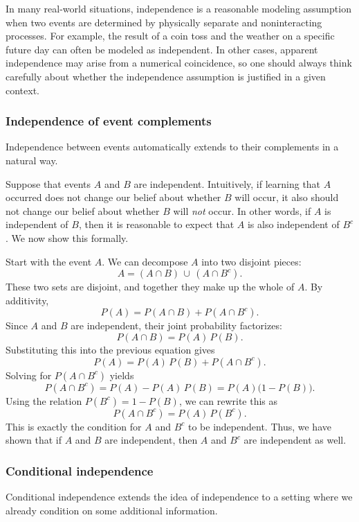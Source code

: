 In many real-world situations, independence is a reasonable modeling assumption when two events are determined by physically separate and noninteracting processes. For example, the result of a coin toss and the weather on a specific future day can often be modeled as independent. In other cases, apparent independence may arise from a numerical coincidence, so one should always think carefully about whether the independence assumption is justified in a given context.


\newpage
\subsubsection{ Independence of event complements}

Independence between events automatically extends to their complements in a natural way.

Suppose that events \(A\) and \(B\) are independent. Intuitively, if learning that \(A\) occurred does not change our belief about whether \(B\) will occur, it also should not change our belief about whether \(B\) will \textit{not} occur. In other words, if \(A\) is independent of \(B\), then it is reasonable to expect that \(A\) is also independent of \(B^c\). We now show this formally.

Start with the event \(A\). We can decompose \(A\) into two disjoint pieces:
\[
A = (A \cap B) \,\cup\, (A \cap B^c).
\]
These two sets are disjoint, and together they make up the whole of \(A\). By additivity,
\[
P(A) = P(A \cap B) + P(A \cap B^c).
\]
Since \(A\) and \(B\) are independent, their joint probability factorizes:
\[
P(A \cap B) = P(A)\,P(B).
\]
Substituting this into the previous equation gives
\[
P(A) = P(A)\,P(B) + P(A \cap B^c).
\]
Solving for \(P(A \cap B^c)\) yields
\[
P(A \cap B^c) = P(A) - P(A)\,P(B)
= P(A)\bigl(1 - P(B)\bigr).
\]
Using the relation \(P(B^c) = 1 - P(B)\), we can rewrite this as
\[
P(A \cap B^c) = P(A)\,P(B^c).
\]
This is exactly the condition for \(A\) and \(B^c\) to be independent. Thus, we have shown that if \(A\) and \(B\) are independent, then \(A\) and \(B^c\) are independent as well.


\subsubsection{Conditional independence}

Conditional independence extends the idea of independence to a setting where we already condition on some additional information.

